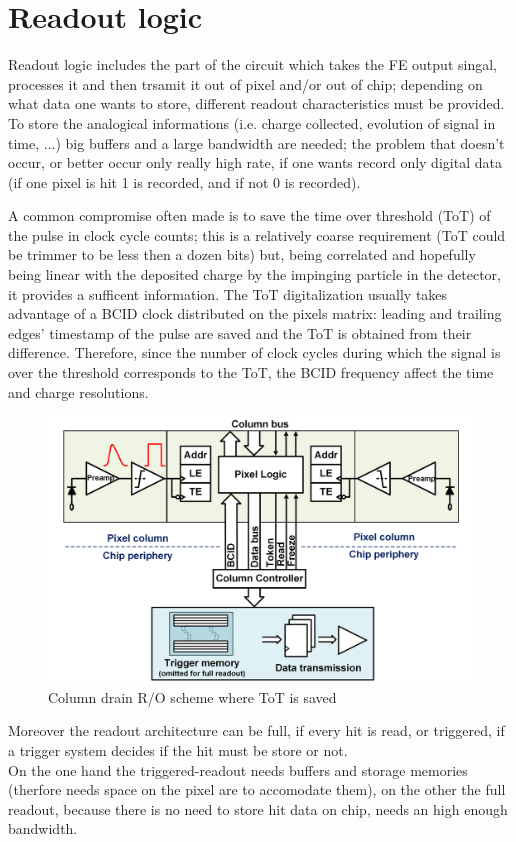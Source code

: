 \section{Readout logic}
   Readout logic includes the part of the circuit which takes the FE output singal, processes it and then trsamit it out of pixel and/or out of chip; depending on what data one wants to store, different readout characteristics must be provided. \\
   To store the analogical informations (i.e. charge collected, evolution of signal in time, ...) big buffers and a large bandwidth are needed; the problem that doesn't occur, or better occur only really high rate, if one wants record only digital data (if one pixel is hit 1 is recorded, and if not 0 is recorded). 

   A common compromise often made is to save the time over threshold (ToT) of the pulse in clock cycle counts; this is a relatively coarse requirement (ToT could be trimmer to be less then a dozen bits) but, being correlated and hopefully being linear with the deposited charge by the impinging particle in the detector, it provides a sufficent information.
   The ToT digitalization usually takes advantage of a BCID clock distributed on the pixels matrix: leading and trailing edges' timestamp of the pulse are saved and the ToT is obtained from their difference. Therefore, since the number of clock cycles during which the signal is over the threshold corresponds to the ToT, the BCID frequency affect the time and charge resolutions.
   \begin{figure}[h!]
      \centering
      \includegraphics[width=.7\linewidth]{figures/Pixel_detectors/column_drain_RO.png}
      \caption{Column drain R/O scheme where ToT is saved}
      \label{fig:column_drain_RO-like}
   \end{figure}

   Moreover the readout architecture can be full, if every hit is read, or triggered, if a trigger system decides if the hit must be store or not. \\
   On the one hand the triggered-readout needs buffers and storage memories (therfore needs space on the pixel are to accomodate them), on the other the full readout, because there is no need to store hit data on chip, needs an high enough bandwidth.


